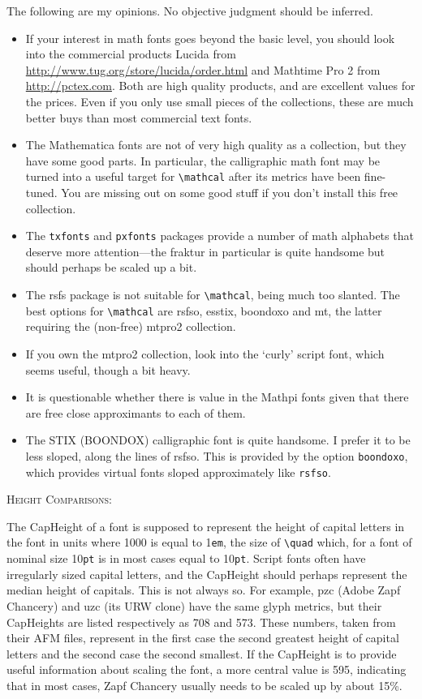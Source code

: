 \documentclass[11pt]{article}
\begin{document}
The following are my opinions. No objective judgment should be inferred.
\begin{itemize}
\item
If your interest in math fonts goes beyond the basic level, you should look into the commercial products \textsf{Lucida} from \url{http://www.tug.org/store/lucida/order.html} and \textsf{Mathtime Pro 2} from \url{http://pctex.com}. Both are high quality products, and are excellent values for the prices. Even if you only use small pieces of the collections, these are much better buys than most commercial text fonts.
\item 
The Mathematica fonts are not of very high quality as a collection, but they have some good parts. In particular, the calligraphic math font may be turned into a useful target for \verb|\mathcal| after its metrics have been fine-tuned.
 You are missing out on some good stuff if you don't install this free collection.
\item The {\tt txfonts} and {\tt pxfonts} packages provide a number of math alphabets that deserve more attention---the fraktur in particular is quite handsome but should perhaps be scaled up a bit.
\item
The \textsf{rsfs} package is not suitable for \verb|\mathcal|, being much too slanted. The best options for \verb|\mathcal| are \textsf{rsfso}, \textsf{esstix}, \textsf{boondoxo} and \textsf{mt}, the latter requiring the (non-free) \textsf{mtpro2} collection. 
\item
If you own the \textsf{mtpro2} collection, look into the `curly' script font, which seems useful, though a bit heavy.
\item It is questionable whether there is value in the \textsf{Mathpi} fonts given that there are free close approximants to each of them. 
\item The STIX (BOONDOX) calligraphic font is quite handsome. I  prefer it to be less sloped, along the lines of rsfso. This is provided by the option {\tt boondoxo}, which provides virtual fonts sloped approximately like {\tt rsfso}.
\end{itemize}

\textsc{Height Comparisons:}

The CapHeight of a font is supposed to represent the height of capital letters in the font in units where 1000 is equal to 1{\tt em}, the size of \verb|\quad| which, for a font of nominal size 10{\tt pt} is in most cases equal to 10{\tt pt}.  Script fonts often have irregularly sized capital letters, and the CapHeight should perhaps represent the median height of capitals. This is not always so. For example, \textsf{pzc} (Adobe Zapf Chancery) and \textsf{uzc} (its URW clone) have the same glyph metrics, but their CapHeights are listed respectively as 708 and 573. These numbers, taken from their AFM files, represent in the first case the second greatest height of  capital letters and the second case the second smallest. If the CapHeight is to provide useful information about scaling the font, a more central value is 595, indicating that in most cases, Zapf Chancery usually needs to be scaled up by about 15\%. 
\end{document}
